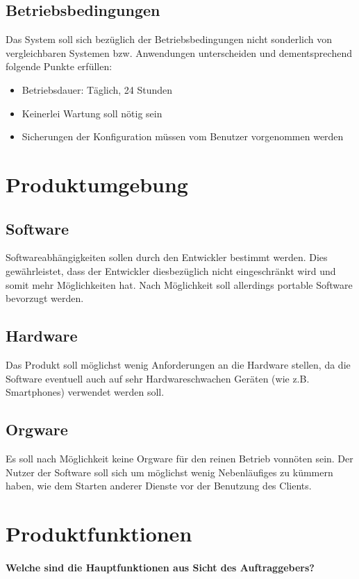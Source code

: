 \subsection{Betriebsbedingungen}
Das System soll sich bezüglich der Betriebsbedingungen nicht sonderlich von vergleichbaren Systemen bzw.
Anwendungen unterscheiden und dementsprechend folgende Punkte erfüllen:
\begin{itemize}
        \item Betriebsdauer: Täglich, 24 Stunden
        \item Keinerlei Wartung soll nötig sein
        \item Sicherungen der Konfiguration müssen vom Benutzer vorgenommen werden
\end{itemize}

\section{Produktumgebung}
\subsection{Software}
Softwareabhängigkeiten sollen durch den Entwickler bestimmt werden.
Dies gewährleistet, dass der Entwickler diesbezüglich nicht eingeschränkt wird
und somit mehr Möglichkeiten hat. Nach Möglichkeit soll allerdings portable Software 
bevorzugt werden.

\subsection{Hardware}
Das Produkt soll möglichst wenig Anforderungen an die Hardware stellen, da
die Software eventuell auch auf sehr Hardwareschwachen Geräten (wie z.B. Smartphones)
verwendet werden soll.

\subsection{Orgware}
Es soll nach Möglichkeit keine Orgware für den reinen Betrieb vonnöten sein. Der Nutzer der Software soll sich
um möglichst wenig Nebenläufiges zu kümmern haben, wie dem Starten anderer Dienste vor der Benutzung des Clients.

\section{Produktfunktionen}
\paragraph{Welche sind die Hauptfunktionen aus Sicht des Auftraggebers?}

